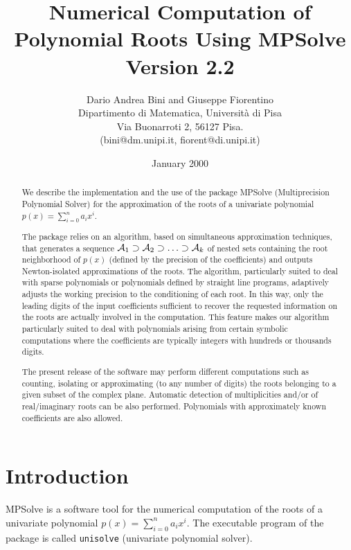\documentclass{article}
\begin{document}
\title{Numerical Computation of Polynomial Roots Using MPSolve \\
        Version  2.2}
\author{Dario Andrea Bini and Giuseppe Fiorentino \\
 Dipartimento di Matematica, Universit\`a di Pisa \\
 Via Buonarroti 2, 56127 Pisa. \\
 (bini@dm.unipi.it, fiorent@di.unipi.it)
}
\date{January 2000}
\maketitle

\begin{abstract}
  We describe the implementation and the use of the package MPSolve
  (Multiprecision Polynomial Solver) for the approximation of the roots
  of a univariate polynomial $p(x)=\sum_{i=0}^n a_i x^i$.
  
  The package relies on an algorithm, based on simultaneous
  approximation techniques, that generates a sequence ${\cal A}_1
  \supset {\cal A}_2 \supset \ldots \supset{\cal A}_k$ of nested sets
  containing the root neighborhood of $p(x)$ (defined by the precision
  of the coefficients) and outputs
  Newton-isolated approximations of the roots.  The algorithm,
  particularly suited to deal with sparse polynomials or polynomials
  defined by straight line programs, adaptively adjusts the working
  precision to the conditioning of each root. In this way, only the
  leading digits of the input coefficients sufficient to recover the
  requested information on the roots are actually involved in the
  computation.  This feature makes our algorithm particularly suited
  to deal with polynomials arising from certain symbolic computations
  where the coefficients are typically integers with hundreds or
  thousands digits.
  
  The present release of the software may perform different computations
  such as counting, isolating or approximating (to any number of
  digits)  the roots belonging to a given subset of the complex plane.
  Automatic detection of multiplicities and/or of real/imaginary roots
  can be also performed. Polynomials with approximately known
  coefficients are also allowed.
\end{abstract}

\section{Introduction}
MPSolve is a software tool for the numerical computation of the roots
of a univariate polynomial $p(x)=\sum_{i=0}^n a_i x^i$.
The executable program of the package is called {\tt unisolve} 
(univariate polynomial solver).
\end{document}
